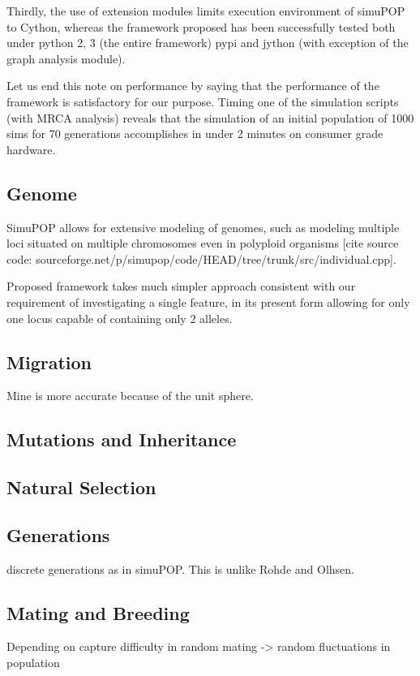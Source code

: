 \documentclass{l4proj}
\begin{document}
Thirdly, the use of extension modules limits execution environment of simuPOP to Cython, whereas the framework proposed has been successfully tested both under python 2, 3 (the entire framework) pypi and jython (with exception of the graph analysis module).

Let us end this note on performance by saying that the performance of the framework is satisfactory for our purpose. Timing one of the simulation scripts (with MRCA analysis) reveals that the simulation of an initial population of 1000 sims for 70 generations accomplishes in under 2 minutes on consumer grade hardware.

\subsection{Genome}
SimuPOP allows for extensive modeling of genomes, such as modeling multiple loci situated on multiple chromosomes even in polyploid organisms [cite source code: sourceforge.net/p/simupop/code/HEAD/tree/trunk/src/individual.cpp].

Proposed framework takes much simpler approach consistent with our requirement of investigating a single feature, in its present form allowing for only one locus capable of containing only 2 alleles.

\subsection{Migration}
Mine is more accurate because of the unit sphere.

\subsection{Mutations and Inheritance}

\subsection{Natural Selection}

\subsection{Generations}
discrete generations as in simuPOP. This is unlike Rohde and Olhsen.

\subsection{Mating and Breeding}
Depending on 
capture difficulty in random mating -> random fluctuations in population 
\end{document}
